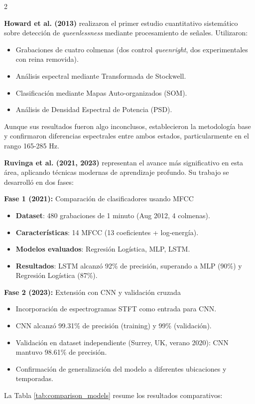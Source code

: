 \documentclass[12pt]{report}
\newenvironment{tightmulticols}{%
  \begin{multicols}{2}
  \setlength{\parskip}{1.2pt}
  \linespread{1}\selectfont
}{%
  \end{multicols}
}
\begin{document}
\begin{tightmulticols}
\par \textbf{Howard et al. (2013)} \cite{howard2013} realizaron el primer estudio cuantitativo sistemático sobre detección de \textit{queenlessness} mediante procesamiento de señales. Utilizaron:

\begin{itemize}
    \item Grabaciones de cuatro colmenas (dos control \textit{queenright}, dos experimentales con reina removida).
    \item Análisis espectral mediante Transformada de Stockwell.
    \item Clasificación mediante Mapas Auto-organizados (SOM).
    \item Análisis de Densidad Espectral de Potencia (PSD).
\end{itemize}

\noindent Aunque sus resultados fueron algo inconclusos, establecieron la metodología base y confirmaron diferencias espectrales entre ambos estados, particularmente en el rango 165-285 Hz.\\

\par\textbf{Ruvinga et al. (2021, 2023)} representan el avance más significativo en esta área, aplicando técnicas modernas de aprendizaje profundo. Su trabajo se desarrolló en dos fases:

\noindent\textbf{Fase 1 (2021)\cite{ruvinga2021}:} Comparación de clasificadores usando MFCC
\begin{itemize}
    \item \textbf{Dataset}: 480 grabaciones de 1 minuto (Aug 2012, 4 colmenas).
    \item \textbf{Características}: 14 MFCC (13 coeficientes + log-energía).
    \item \textbf{Modelos evaluados}: Regresión Logística, MLP, LSTM.
    \item \textbf{Resultados}: LSTM alcanzó 92\% de precisión, superando a MLP (90\%) y Regresión Logística (87\%).
\end{itemize}

\noindent\textbf{Fase 2 (2023)\cite{ruvinga2023}:} Extensión con CNN y validación cruzada
\begin{itemize}
    \item Incorporación de espectrogramas STFT como entrada para CNN.
    \item CNN alcanzó 99.31\% de precisión (training) y 99\% (validación).
    \item Validación en dataset independiente (Surrey, UK, verano 2020): CNN mantuvo 98.61\% de precisión.
    \item Confirmación de generalización del modelo a diferentes ubicaciones y temporadas.
\end{itemize}

\noindent La Tabla \ref{tab:comparison_models} resume los resultados comparativos:

\end{tightmulticols}
\end{document}

